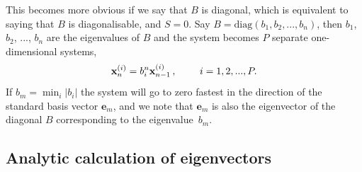 This becomes more obvious if we say that $B$ is diagonal, which is equivalent to saying that $B$ is diagonalisable, and $S=0$. Say $B=\text{diag}(b_1, b_2, ..., b_n)$, then $b_1$, $b_2$, ..., $b_n$ are the eigenvalues of $B$ and the system becomes $P$ separate one-dimensional systems,
\begin{equation}
\mathbf{x}_n^{(i)} = b_i^n \mathbf{x}_{n-1}^{(i)}\, ,~~~~~~~ i=1,2,...,P.
\end{equation}
If $b_m = \min_i|b_i|$ the system will go to zero fastest in the direction of the standard basis vector $\mathbf{e}_m$, and we note that $\mathbf{e}_m$ is also the eigenvector of the diagonal $B$ corresponding to the eigenvalue~$b_m$.

\subsection{Analytic calculation of eigenvectors}
\label{sub:EOF-analysis}

